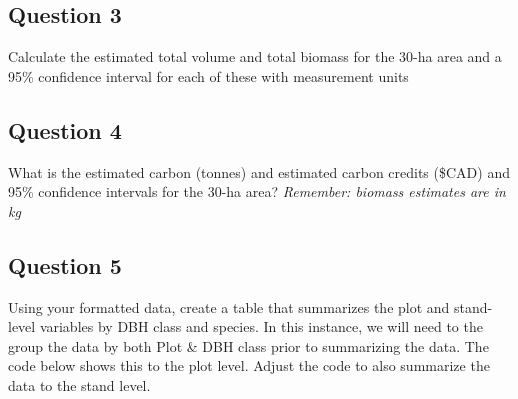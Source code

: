 \documentclass[
  letterpaper,
]{book}
\newenvironment{Shaded}{\begin{snugshade}}{\end{snugshade}}
\newcommand{\CommentTok}[1]{\textcolor[rgb]{0.37,0.37,0.37}{#1}}
\newcommand{\DecValTok}[1]{\textcolor[rgb]{0.68,0.00,0.00}{#1}}
\newcommand{\NormalTok}[1]{\textcolor[rgb]{0.00,0.23,0.31}{#1}}
\newcommand{\OtherTok}[1]{\textcolor[rgb]{0.00,0.23,0.31}{#1}}
\newcommand{\SpecialCharTok}[1]{\textcolor[rgb]{0.37,0.37,0.37}{#1}}
\begin{document}
\hypertarget{question-3-3}{%
\subsection{Question 3}\label{question-3-3}}

Calculate the estimated total volume and total biomass for the 30-ha
area and a 95\% confidence interval for each of these with measurement
units

\begin{Shaded}
\end{Shaded}

\hypertarget{question-4-3}{%
\subsection{Question 4}\label{question-4-3}}

What is the estimated carbon (tonnes) and estimated carbon credits
(\$CAD) and 95\% confidence intervals for the 30-ha area?
\emph{Remember: biomass estimates are in kg}

\hypertarget{question-5-3}{%
\subsection{Question 5}\label{question-5-3}}

Using your formatted data, create a table that summarizes the plot and
stand-level variables by DBH class and species. In this instance, we
will need to the group the data by both Plot \& DBH class prior to
summarizing the data. The code below shows this to the plot level.
Adjust the code to also summarize the data to the stand level.
\end{document}
